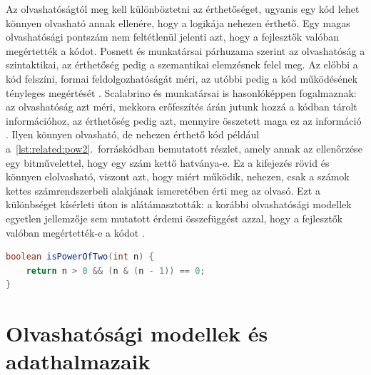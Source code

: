 \documentclass[
]{elteikthesis}[2024/04/26]
\begin{document}
Az olvashatóságtól meg kell különböztetni az érthetőséget, ugyanis %
egy kód lehet könnyen olvasható annak ellenére, hogy
a logikája nehezen érthető. Egy magas olvashatósági pontszám nem
feltétlenül jelenti azt, hogy a fejlesztők valóban megértették a kódot. Posnett
és munkatársai párhuzama szerint az olvashatóság a szintaktikai, az érthetőség
pedig a szemantikai elemzésnek felel meg. Az előbbi a kód felszíni, formai
feldolgozhatóságát %
méri, az utóbbi pedig a kód működésének tényleges megértését
\cite{posnett2011simpler}. Scalabrino és munkatársai is hasonlóképpen
fogalmaznak: az olvashatóság azt méri, mekkora erőfeszítés árán jutunk hozzá a
kódban tárolt információhoz, az érthetőség pedig azt, mennyire összetett maga ez
az információ \cite{scalabrino2018comprehensive}. Ilyen könnyen olvasható, de
nehezen érthető kód például a~\ref{lst:related:pow2}.~forráskódban bemutatott
részlet, amely annak az ellenőrzése egy bitművelettel, hogy egy szám kettő
hatványa-e. Ez a kifejezés rövid és könnyen elolvasható, viszont azt, hogy miért
működik, nehezen, csak a számok kettes számrendszerbeli alakjának ismeretében
érti meg az olvasó. Ezt a különbséget kísérleti úton is alátámasztották: a
korábbi olvashatósági modellek egyetlen jellemzője sem mutatott érdemi
összefüggést azzal, hogy a fejlesztők valóban megértették-e a kódot
\cite{scalabrino2017understandability}.

\begin{lstlisting}[language=Java, caption={Könnyen olvasható, nehezen érthető Java-metódus}, label={lst:related:pow2}]
boolean isPowerOfTwo(int n) {
    return n > 0 && (n & (n - 1)) == 0;
}
\end{lstlisting}

\section{Olvashatósági modellek és adathalmazaik}
\label{sec:related:models}
\end{document}
